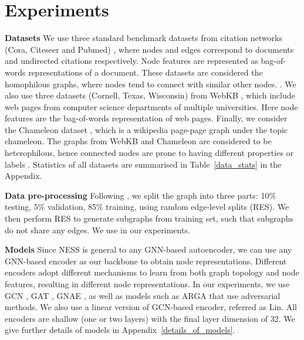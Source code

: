 \documentclass{article}
\begin{document}
\section{Experiments}\label{exp_setup}


\textbf{Datasets} We use three standard benchmark datasets from citation networks (Cora, Citeseer and Pubmed) \citep{sen2008collective}, where nodes and edges correspond to documents and undirected citations respectively. Node features are represented as bag-of-words representations of a document. These datasets are considered the homophilous graphs, where nodes tend to connect with similar other nodes. \citep{mcpherson2001birds}. We also use three datasets (Cornell, Texas, Wisconsin) from WebKB \citep{pei2020geom}, which include web pages from computer science departments of multiple universities. Here node features are the bag-of-words representation of web pages. Finally, we consider the Chameleon dataset \citep{rozemberczki2021multi}, which is a wikipedia page-page graph under the topic chameleon. The graphs from WebKB and Chameleon are considered to be heterophilous, hence connected nodes are prone to having different properties or labels \citep{zhu2020beyond, wang2022augmentation}. Statistics of all datasets are summarised in Table~\ref{data_stats} in the Appendix.

\textbf{Data pre-processing} Following \citep{kipf2016variational}, we split the graph into three parts: 10\% testing, 5\% validation, 85\% training, using random edge-level splits (RES). We then perform RES to generate  subgraphs from training set, such that subgraphs do not share any edges. We use  in our experiments.

\textbf{Models} Since NESS is general to any GNN-based autoencoder, we can use any GNN-based encoder as our backbone to obtain node representations. Different encoders adopt different mechanisms to learn from both graph topology and node features, resulting in different node representations. In our experiments, we use GCN \citep{kipf2016variational}, GAT \citep{velivckovic2017graph}, GNAE \citep{ahn2021variational}, as well as models such as ARGA \citep{pan2019learning} that use adversarial methods. We also use a linear version of GCN-based encoder, referred as Lin. All encoders are shallow (one or two layers) with the final layer dimension of 32. We give further details of models in Appendix~\ref{details_of_models}.
\end{document}
